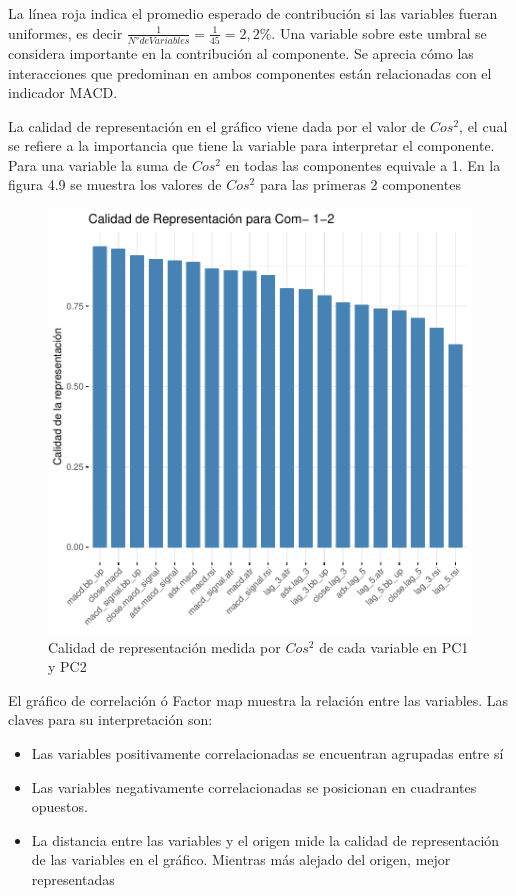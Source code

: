 \documentclass[a4paper,12pt]{Latex/Classes/PhDthesisPSnPDF}
\begin{document}
La línea roja indica el promedio esperado de contribución si las variables fueran uniformes, es decir $ \frac{1}{N° de Variables} = \frac{1}{45} = 2,2\%$. Una variable sobre este umbral se considera importante en la contribución al componente. Se aprecia cómo las interacciones que predominan en ambos componentes están relacionadas con el indicador MACD.

La calidad de representación en el gráfico viene dada por el valor de $Cos^2$, el cual se refiere a la importancia que tiene la variable para interpretar el componente. Para una variable la suma de $Cos^2$ en todas las componentes equivale a 1. En la figura 4.9 se muestra los valores de $Cos^2$ para las primeras 2 componentes

\begin{figure}[H]
\centering
\includegraphics{main-015}
\caption{Calidad de representación medida por $Cos^2$ de cada variable en PC1 y PC2}
\end{figure}

El gráfico de correlación ó Factor map muestra la relación entre las variables. Las claves para su interpretación son:

\begin{itemize}
\item Las variables positivamente correlacionadas se encuentran agrupadas entre sí
\item Las variables negativamente correlacionadas se posicionan en cuadrantes opuestos.
\item La distancia entre las variables y el origen mide la calidad de representación de las variables en el gráfico. Mientras más alejado del origen, mejor representadas 
\end{itemize}
\end{document}
